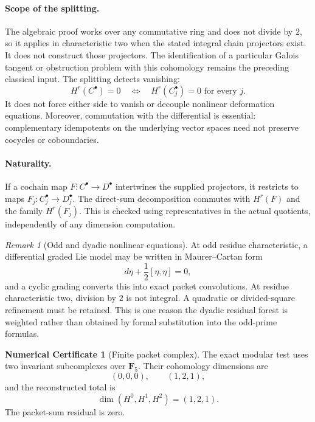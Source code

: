 \documentclass[11pt]{article}
\theoremstyle{definition}
\newtheorem{numericalcertificate}[theorem]{Numerical Certificate}
\theoremstyle{remark}
\newtheorem{remark}[theorem]{Remark}
\newcommand{\F}{\mathbf F}
\begin{document}
\paragraph{Scope of the splitting.}
The algebraic proof works over any commutative ring and does not divide by
\(2\), so it applies in characteristic two when the stated integral
chain projectors exist. It does not construct those projectors. The
identification of a particular Galois tangent or obstruction problem with
this cohomology remains the preceding classical input.
The splitting detects vanishing:
\[
H^r(C^\bullet)=0\quad\Longleftrightarrow\quad
H^r(C_j^\bullet)=0\text{ for every }j.
\]
It does not force either side to vanish or decouple nonlinear deformation
equations. Moreover, commutation with the differential is essential:
complementary idempotents on the underlying vector spaces need not
preserve cocycles or coboundaries.

\paragraph{Naturality.}
If a cochain map \(F:C^\bullet\to D^\bullet\) intertwines the supplied
projectors, it restricts to maps \(F_j:C_j^\bullet\to D_j^\bullet\).
The direct-sum decomposition commutes with \(H^r(F)\) and the family
\(H^r(F_j)\). This is checked using representatives in the actual
quotients, independently of any dimension computation.


\begin{remark}[Odd and dyadic nonlinear equations]\label{px:4.3}
At odd residue characteristic, a differential graded Lie model may be written in Maurer--Cartan form
\[
d\eta+\frac12[\eta,\eta]=0,
\]
and a cyclic grading converts this into exact packet convolutions.  At residue characteristic two, division by \(2\) is not integral.  A quadratic or divided-square refinement must be retained.  This is one reason the dyadic residual forest is weighted rather than obtained by formal substitution into the odd-prime formulas.
\end{remark}

\begin{numericalcertificate}[Finite packet complex]\label{px:4.4}
The exact modular test uses two invariant subcomplexes over \(\F_5\).  Their cohomology dimensions are
\[
(0,0,0),
\qquad
(1,2,1),
\]
and the reconstructed total is
\[
\dim(H^0,H^1,H^2)=(1,2,1).
\]
The packet-sum residual is zero.
\end{numericalcertificate}
\end{document}
